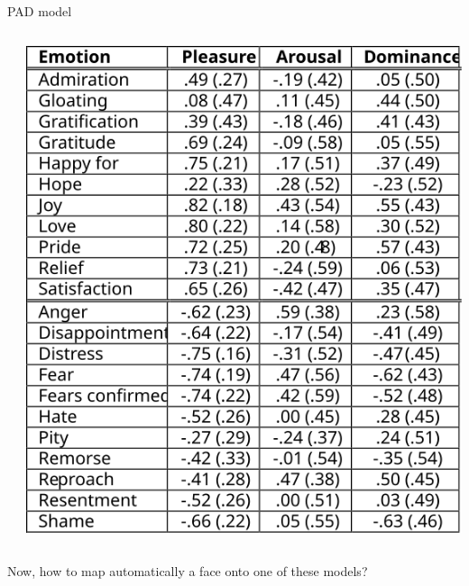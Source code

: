 \documentclass[compress]{beamer}
\makeatletter
\let\beamer@writeslidentry@miniframeson=\beamer@writeslidentry
\def\beamer@writeslidentry@miniframesoff{%
  \expandafter\beamer@ifempty\expandafter{\beamer@framestartpage}{}%
  {%
    \clearpage\beamer@notesactions%
  }
}
\newcommand*{\miniframeson}{\let\beamer@writeslidentry=\beamer@writeslidentry@miniframeson}
\newcommand*{\miniframesoff}{\let\beamer@writeslidentry=\beamer@writeslidentry@miniframesoff}
\makeatother
\begin{document}
{\begin{frame}{PAD model}
\begin{columns}
\begin{column}{0.5\linewidth}
        \end{column}
        \begin{column}{0.5\linewidth}
        \begin{center}
            \includegraphics[width=\linewidth]{pad-mapping}
        \end{center}
        \end{column}
    \end{columns}

\end{frame}
}

\miniframesoff

\begin{frame}[plain]
    \begin{center}
        Now, how to map automatically a face onto one of these models?
    \end{center}
\end{frame}

\miniframeson
\end{document}

